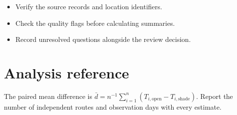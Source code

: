 \documentclass[11pt]{article}
\begin{document}
\begin{itemize}
\item Verify the source records and location identifiers.
\item Check the quality flags before calculating summaries.
\item Record unresolved questions alongside the review decision.
\end{itemize}

\section*{Analysis reference}
The paired mean difference is $\bar{d}=n^{-1}\sum_{i=1}^{n}(T_{i,\mathrm{open}}-T_{i,\mathrm{shade}})$. Report the number of independent routes and observation days with every estimate.
\end{document}
